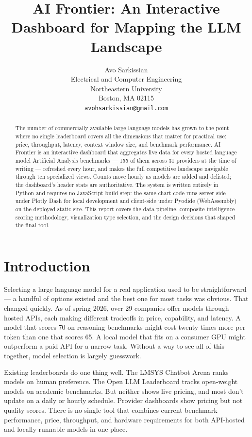 \documentclass{article}
\title{AI Frontier: An Interactive Dashboard for Mapping the LLM Landscape}
\author{
  Avo Sarkissian \\
  Electrical and Computer Engineering \\
  Northeastern University \\
  Boston, MA 02115 \\
  \texttt{avohsarkissian@gmail.com}
}
\begin{document}
\maketitle

\begin{abstract}
The number of commercially available large language models has grown to
the point where no single leaderboard covers all the dimensions that matter
for practical use: price, throughput, latency, context window size, and
benchmark performance. AI Frontier is an interactive dashboard that aggregates
live data for every hosted language model Artificial Analysis benchmarks ---
155 of them across 31 providers at the time of writing --- refreshed every hour,
and makes the full competitive landscape navigable through ten specialized
views. Counts move hourly as models are added and delisted; the dashboard's
header stats are authoritative. The system is written entirely in Python and
requires no JavaScript build step: the same chart code runs server-side under
Plotly Dash for local development and client-side under Pyodide (WebAssembly)
on the deployed static site. This report covers the data pipeline, composite
intelligence scoring methodology, visualization type selection, and the design
decisions that shaped the final tool.
\end{abstract}

\section{Introduction}

Selecting a large language model for a real application used to be
straightforward --- a handful of options existed and the best one for most tasks
was obvious. That changed quickly. As of spring 2026, over 29 companies offer
models through hosted APIs, each making different tradeoffs in price,
capability, and latency. A model that scores 70 on reasoning benchmarks might
cost twenty times more per token than one that scores 65. A local model that
fits on a consumer GPU might outperform a paid API for a narrow task.
Without a way to see all of this together, model selection is largely
guesswork.

Existing leaderboards do one thing well. The LMSYS Chatbot Arena
\cite{lmsys} ranks models on human preference. The Open LLM Leaderboard
\cite{openllm} tracks open-weight models on academic benchmarks. But neither
shows live pricing, and most don't update on a daily or hourly schedule.
Provider dashboards show pricing but not quality scores. There is no single
tool that combines current benchmark performance, price, throughput, and
hardware requirements for both API-hosted and locally-runnable models in one
place.
\end{document}
